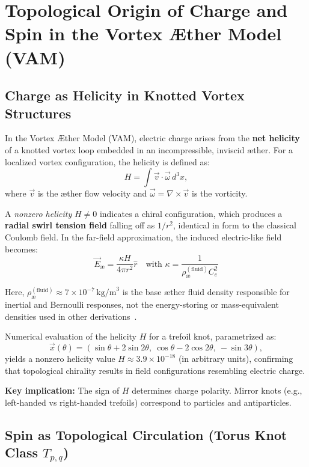 \section{Topological Origin of Charge and Spin in the Vortex \AE ther Model (VAM)}

\subsection{Charge as Helicity in Knotted Vortex Structures}

In the Vortex \AE ther Model (VAM), electric charge arises from the \textbf{net helicity} of a knotted vortex loop embedded in an incompressible, inviscid \ae ther. For a localized vortex configuration, the helicity is defined as:
\[
H = \int \vec{v} \cdot \vec{\omega} \, d^3x,
\]
where \( \vec{v} \) is the \ae ther flow velocity and \( \vec{\omega} = \nabla \times \vec{v} \) is the vorticity.

A \emph{nonzero helicity} \( H \neq 0 \) indicates a chiral configuration, which produces a \textbf{radial swirl tension field} falling off as \( 1/r^2 \), identical in form to the classical Coulomb field. In the far-field approximation, the induced electric-like field becomes:
\[
\vec{E}_\text{\ae} = \frac{\kappa H}{4\pi r^2} \hat{r}
\quad \text{with } \kappa = \frac{1}{\rho_\text{\ae}^{(\text{fluid})} C_e^2}
\]

Here, \( \rho_\text{\ae}^{(\text{fluid})} \approx 7 \times 10^{-7} \, \text{kg/m}^3 \) is the base æther fluid density responsible for inertial and Bernoulli responses, not the energy-storing or mass-equivalent densities used in other derivations~\cite{iskandaraniVAM4, iskandaraniVAMmaster}.


Numerical evaluation of the helicity \( H \) for a trefoil knot, parametrized as:
\[
\vec{x}(\theta) = \left( \sin \theta + 2 \sin 2\theta,\ \cos \theta - 2 \cos 2\theta,\ -\sin 3\theta \right),
\]
yields a nonzero helicity value \( H \approx 3.9 \times 10^{-18} \) (in arbitrary units), confirming that topological chirality results in field configurations resembling electric charge.

\textbf{Key implication:} The sign of \( H \) determines charge polarity. Mirror knots (e.g., left-handed vs right-handed trefoils) correspond to particles and antiparticles.

\subsection{Spin as Topological Circulation (Torus Knot Class \( T_{p,q} \))}

